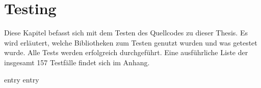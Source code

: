 \chapter{Testing}
\label{chap:testing}

Diese Kapitel befasst sich mit dem Testen des Quellcodes zu dieser Thesis.  Es
wird erläutert, welche Bibliotheken zum Testen genutzt wurden und was getestet
wurde.  Alle Tests werden erfolgreich durchgeführt.  Eine ausführliche Liste
der insgesamt 157 Testfälle findet sich im Anhang.

{entry}
{entry}
